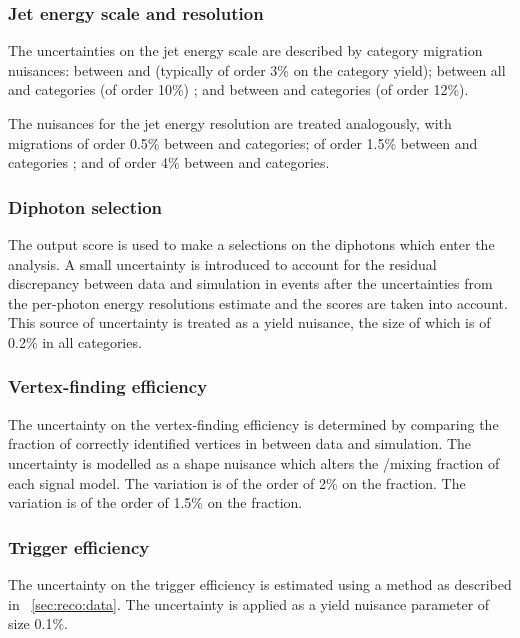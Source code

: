 \subsubsection{Jet energy scale and resolution}
The uncertainties on the jet energy scale are described by category migration nuisances: between  and  (typically of order 3\% on the category yield); between all \VBF and \Untagged categories (of order 10\%) ; and between \TTHTag and \Untagged categories (of order 12\%).

The nuisances for the jet energy resolution are treated analogously, with migrations of order 0.5\% between  and  categories; of order 1.5\% between \VBF and \Untagged categories ; and of order 4\% between \TTHTag and \Untagged categories.

\subsubsection{Diphoton selection}
The \DiPhoBdt output score is used to make a selections on the diphotons which enter the analysis. A small uncertainty is introduced to account for the residual discrepancy between data and simulation in \Zee events after the uncertainties from the per-photon energy resolutions estimate and the \PhoIdBdt scores are taken into account. This source of uncertainty is treated as a yield nuisance, the size of which is of 0.2\% in all categories. 

\subsubsection{Vertex-finding efficiency}
The uncertainty on the vertex-finding efficiency is determined by comparing the fraction of correctly identified vertices in \Zmumu between data and simulation. The uncertainty is modelled as a shape nuisance which alters the \RV/\WV mixing fraction of each signal model. 
\ifNewAnalysis
The variation is of the order of 2\% on the \RV fraction.
\else
The variation is of the order of 1.5\% on the \RV fraction.
\fi

\subsubsection{Trigger efficiency}
The uncertainty on the trigger efficiency is estimated using a \TagAndProbe method as described in \Sec~\ref{sec:reco:data}. The uncertainty is applied as a yield nuisance parameter of size 0.1\%.

